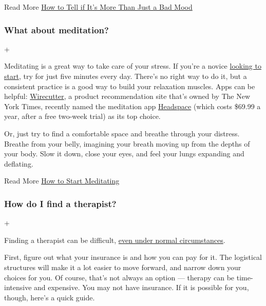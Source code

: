 Read More
\href{https://www.nytimes3xbfgragh.onion/2020/05/21/well/coronavirus-depression.html}{How
to Tell if It's More Than Just a Bad Mood}

\hypertarget{what-about-meditation}{%
\subsubsection{What about meditation?}\label{what-about-meditation}}

+

Meditating is a great way to take care of your stress. If you're a
novice
\href{https://www.nytimes3xbfgragh.onion/2020/06/22/at-home/how-to-start-meditating.html}{looking
to start}, try for just five minutes every day. There's no right way to
do it, but a consistent practice is a good way to build your relaxation
muscles. Apps can be helpful:
\href{https://www.nytimes3xbfgragh.onion/wirecutter/}{Wirecutter}, a
product recommendation site that's owned by The New York Times, recently
named the meditation app \href{https://www.headspace.com/}{Headspace}
(which costs \$69.99 a year, after a free two-week trial) as its top
choice.

Or, just try to find a comfortable space and breathe through your
distress. Breathe from your belly, imagining your breath moving up from
the depths of your body. Slow it down, close your eyes, and feel your
lungs expanding and deflating.

Read More
\href{https://www.nytimes3xbfgragh.onion/2020/06/22/at-home/how-to-start-meditating.html}{How
to Start Meditating}

\hypertarget{how-do-i-find-a-therapist}{%
\subsubsection{How do I find a
therapist?}\label{how-do-i-find-a-therapist}}

+

Finding a therapist can be difficult,
\href{https://www.nytimes3xbfgragh.onion/2017/07/17/smarter-living/how-to-find-the-right-therapist.html}{even
under normal circumstances}.

First, figure out what your insurance is and how you can pay for it. The
logistical structures will make it a lot easier to move forward, and
narrow down your choices for you. Of course, that's not always an option
--- therapy can be time-intensive and expensive. You may not have
insurance. If it is possible for you, though, here's a quick guide.

